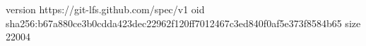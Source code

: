 version https://git-lfs.github.com/spec/v1
oid sha256:b67a880ce3b0cdda423dec22962f120ff7012467c3ed840f0af5e373f8584b65
size 22004
